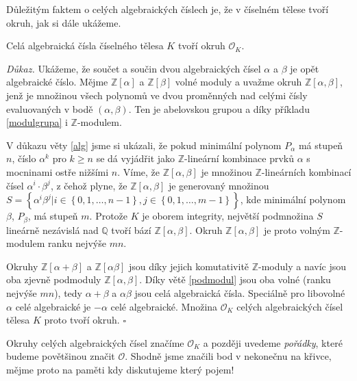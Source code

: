 \documentclass[12pt]{report}
\begin{document}
Důležitým faktem o celých algebraických číslech je, že v číselném tělese tvoří okruh, jak si dále ukážeme.

\begin{veta}
Celá algebraická čísla číselného tělesa $K$ tvoří okruh $\mathcal{O}_K$.
\end{veta}
\noindent \textit{Důkaz.} Ukážeme, že součet a součin dvou algebraických čísel $\alpha$ a $\beta$ je opět algebraické číslo. Mějme $\mathbb{Z}[\alpha]$ a $\mathbb{Z}[\beta]$ volné moduly a uvažme okruh $\mathbb{Z}[\alpha,\beta]$, jenž je množinou všech polynomů ve dvou proměnných nad celými čísly evaluovaných v bodě $(\alpha,\beta)$. Ten je abelovskou grupou a díky příkladu \ref{modulgrupa} i $\mathbb{Z}$-modulem.

V důkazu věty \ref{alg} jsme si ukázali, že pokud minimální polynom $P_\alpha$ má stupeň $n$, číslo $\alpha^k$ pro $k \geqslant n$ se dá vyjádřit jako $\mathbb{Z}$-lineární kombinace prvků $\alpha$ s mocninami ostře nižšími $n$. Víme, že $\mathbb{Z}[\alpha,\beta]$ je množinou $\mathbb{Z}$-lineárních kombinací čísel $\alpha^i \cdot \beta^j$, z čehož plyne, že $\mathbb{Z}[\alpha,\beta]$ je generovaný množinou $S = \left\lbrace \alpha^i \beta^j \vert i \in \left\lbrace 0,1,\dots,n-1 \right\rbrace, j \in \left\lbrace 0,1,\dots,m-1 \right\rbrace \right\rbrace$, kde minimální polynom $\beta$, $P_\beta$, má stupeň $m$. Protože $K$ je oborem integrity, největší podmnožina $S$ lineárně nezávislá nad $\mathbb{Q}$ tvoří bází $\mathbb{Z}[\alpha,\beta]$. Okruh $\mathbb{Z}[\alpha,\beta]$ je proto volným $\mathbb{Z}$-modulem ranku nejvýše $mn$.

Okruhy $\mathbb{Z}[\alpha+\beta]$ a $\mathbb{Z}[\alpha \beta]$ jsou díky jejich komutativitě $\mathbb{Z}$-moduly a navíc jsou oba zjevně podmoduly $\mathbb{Z}[\alpha,\beta]$. Díky větě \ref{podmodul} jsou oba volné (ranku nejvýše $mn$), tedy $\alpha+\beta$ a $\alpha \beta$ jsou celá algebraická čísla. Speciálně pro libovolné $\alpha$ celé algebraické je $-\alpha$ celé algebraické. Množina $\mathcal{O}_K$ celých algebraických čísel tělesa $K$ proto tvoří okruh. \hfill $\square$\\

\begin{poznamka}
Okruhy celých algebraických čísel značíme $\mathcal{O}_K$ a později uvedeme \textit{pořádky}, které budeme povětšinou značit $\mathcal{O}$. Shodně jsme značili bod v nekonečnu na křivce, mějme proto na paměti kdy diskutujeme který pojem!
\end{poznamka}
\end{document}
